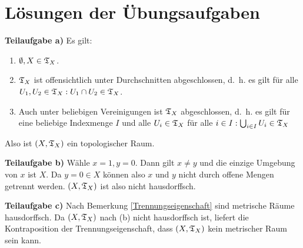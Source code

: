 \chapter*{Lösungen der Übungsaufgaben}
\begin{solution}[\ref{ub1:aufg1}]
    \textbf{Teilaufgabe a)} Es gilt:
    \begin{enumerate}[label=(\roman*)]
        \item $\emptyset, X \in \mathfrak{T}_X$.
        \item $\mathfrak{T}_X$ ist offensichtlich unter Durchschnitten abgeschlossen,
              d.~h. es gilt für alle $U_1, U_2 \in \mathfrak{T}_X: U_1 \cap U_2 \in \mathfrak{T}_X$.
        \item Auch unter beliebigen Vereinigungen ist $\mathfrak{T}_X$ abgeschlossen,
              d.~h. es gilt für eine beliebige Indexmenge $I$ und alle
              $U_i \in \mathfrak{T}_X$ für alle $i \in I: \bigcup_{i \in I} U_i \in \mathfrak{T}_X$
    \end{enumerate}

    Also ist $(X, \mathfrak{T}_X)$ ein topologischer Raum.

    \textbf{Teilaufgabe b)} Wähle $x=1, y=0$. Dann gilt $x \neq y$
    und die einzige Umgebung von $x$ ist $X$. Da $y=0 \in X$ können
    also $x$ und $y$ nicht durch offene Mengen getrennt werden.
    $(X, \mathfrak{T}_X)$ ist also nicht hausdorffsch.

    \textbf{Teilaufgabe c)} Nach Bemerkung \ref{Trennungseigenschaft}
    sind metrische Räume hausdorffsch. Da $(X, \mathfrak{T}_X)$ nach (b) nicht 
    hausdorffsch ist, liefert die Kontraposition der Trennungseigenschaft,
    dass $(X, \mathfrak{T}_X)$ kein metrischer Raum sein kann.
\end{solution}

\begin{solution}[\ref{ub1:aufg4}]
\end{solution}

